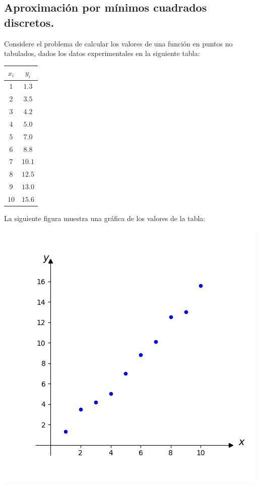\subsection{Aproximación por mínimos cuadrados discretos.}
Considere el problema de calcular los valores de una función en puntos no tabulados, dados los datos experimentales en la siguiente tabla:
\begin{center}
  \begin{tabular}{|c|c|}
    \hline
    $x_i$ & $y_i$\\
    \hline 
    $1$ & $1.3$\\
    $2$ & $3.5$\\
    $3$ & $4.2$\\
    $4$ & $5.0$\\
    $5$ & $7.0$\\
    $6$ & $8.8$\\
    $7$ & $10.1$\\
    $8$ & $12.5$\\
    $9$ & $13.0$\\
    $10$ & $15.6$\\
    \hline
  \end{tabular}
\end{center}
La siguiente figura muestra una gráfica de los valores de la tabla:
\begin{center}
  \includegraphics[scale=0.7]{chapters/chapter02/scripts/tabla.png}  
\end{center}
